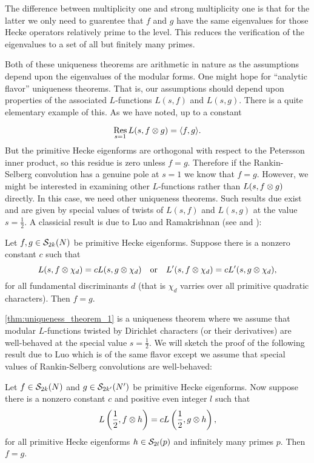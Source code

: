 \documentclass[12pt,reqno,oneside]{amsart}
\begin{document}
    The difference between multiplicity one and strong multiplicity one is that for the latter we only need to guarentee that $f$ and $g$ have the same eigenvalues for those Hecke operators relatively prime to the level. This reduces the verification of the eigenvalues to a set of all but finitely many primes.
    
    Both of these uniqueness theorems are arithmetic in nature as the assumptions depend upon the eigenvalues of the modular forms. One might hope for ``analytic flavor'' uniqueness theorems. That is, our assumptions should depend upon properties of the associated $L$-functions $L(s,f)$ and $L(s,g)$. There is a quite elementary example of this. As we have noted, up to a constant

    \[
        \operatorname*{\mathrm{Res}}_{s = 1}L(s,f \otimes g) = \langle f,g\rangle.
    \]
    But the primitive Hecke eigenforms are orthogonal with respect to the Petersson inner product, so this residue is zero unless $f = g$. Therefore if the Rankin-Selberg convolution has a genuine pole at $s = 1$ we know that $f = g$. However, we might be interested in examining other $L$-functions rather than $L(s,f \otimes g)$ directly. In this case, we need other uniqueness theorems. Such results due exist and are given by special values of twists of $L(s,f)$ and $L(s,g)$ at the value $s = \frac{1}{2}$. A classicial result is due to Luo and Ramakrishnan (see \cite{LR-1} and \cite{LR-2}):

    \begin{theorem}\label{thm:uniqueness_theorem_1}
        Let $f,g \in \mathcal{S}_{2k}(N)$ be primitive Hecke eigenforms. Suppose there is a nonzero constant $c$ such that
        \[
            L(s,f \otimes \chi_{d}) = cL(s,g \otimes \chi_{d}) \quad \text{or} \quad L'(s,f \otimes \chi_{d}) = cL'(s,g \otimes \chi_{d}),
        \]
        for all fundamental discriminants $d$ (that is $\chi_{d}$ varries over all primitive quadratic characters). Then $f = g$.
    \end{theorem}

    \cref{thm:uniqueness_theorem_1} is a uniqueness theorem where we assume that modular $L$-functions twisted by Dirichlet characters (or their derivatives) are well-behaved at the special value $s = \frac{1}{2}$. We will sketch the proof of the following result due to Luo which is of the same flavor except we assume that special values of Rankin-Selberg convolutions are well-behaved:

    \begin{theorem}\label{thm:uniqueness_theorem_2}
        Let $f \in \mathcal{S}_{2k}(N)$ and $g \in \mathcal{S}_{2k'}(N')$ be primitive Hecke eigenforms. Now suppose there is a nonzero constant $c$ and positive even integer $l$ such that
        \[
            L\left(\frac{1}{2},f \otimes h\right) = cL\left(\frac{1}{2},g \otimes h\right),
        \]
        for all primitive Hecke eigenforms $h \in \mathcal{S}_{2l}(p)$ and infinitely many primes $p$. Then $f = g$.
    \end{theorem}
\end{document}
